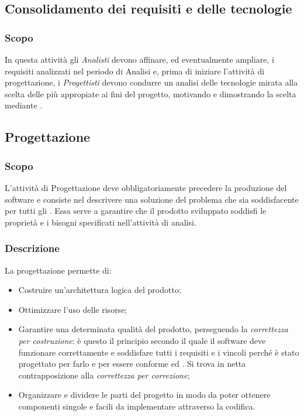 \documentclass[../NomeDocumento.tex]{subfiles}
\begin{document}
\subsection{Consolidamento dei requisiti e delle tecnologie}

	\subsubsection{Scopo} 
	
	In questa attività gli \textit{Analisti} devono affinare, ed eventualmente ampliare, i requisiti analizzati nel periodo di Analisi e, prima di iniziare l'attività di progettazione, i \textit{Progettisti} devono condurre un analisi delle tecnologie mirata alla scelta delle più appropiate ai fini del progetto, motivando e dimostrando la scelta mediante .
	
\subsection{Progettazione} 

	\subsubsection{Scopo} 

	L'attività di Progettazione deve obbligatoriamente precedere la produzione del software e consiste nel descrivere una soluzione del problema che sia soddisfacente per tutti gli . Essa serve a garantire che il prodotto sviluppato soddisfi le proprietà e i bisogni specificati nell'attività di analisi. 
	\subsubsection{Descrizione}
	
	La progettazione permette di:
	
	\begin{itemize}
		\item Costruire un’architettura logica del prodotto;
		\item Ottimizzare l’uso delle risorse;
		\item Garantire una determinata qualità del prodotto, perseguendo la \textit{correttezza per costruzione}: è questo il principio secondo il quale il software deve funzionare correttamente e soddisfare tutti i requisiti e i vincoli perché è stato progettato per farlo e per essere conforme ed . Si trova in netta contrapposizione alla \textit{correttezza per
		correzione};
		\item Organizzare e dividere le parti del progetto in modo da poter ottenere componenti singole e facili da implementare attraverso la codifica. 
	\end{itemize}
\end{document}
